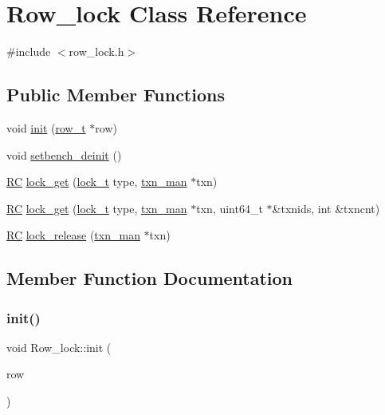 \hypertarget{classRow__lock}{}\section{Row\+\_\+lock Class Reference}
\label{classRow__lock}


{\ttfamily \#include $<$row\+\_\+lock.\+h$>$}

\subsection*{Public Member Functions}
\begin{DoxyCompactItemize}
\item 
void \hyperlink{classRow__lock_a6958edf717b09d6afb977c62a36ac76a}{init} (\hyperlink{classrow__t}{row\+\_\+t} $\ast$row)
\item 
void \hyperlink{classRow__lock_a1d79fae5c2c99d47eed437628ef21ab5}{setbench\+\_\+deinit} ()
\item 
\hyperlink{global_8h_a78c49a674c810fdd03d20432f7be864a}{RC} \hyperlink{classRow__lock_a73d7d8b8dba43b90e69e52f8596dd4c7}{lock\+\_\+get} (\hyperlink{global_8h_a1da8554b34c21f74268d962b6559b0a6}{lock\+\_\+t} type, \hyperlink{classtxn__man}{txn\+\_\+man} $\ast$txn)
\item 
\hyperlink{global_8h_a78c49a674c810fdd03d20432f7be864a}{RC} \hyperlink{classRow__lock_a09a8f64b3aa2560f46f185f603fb3571}{lock\+\_\+get} (\hyperlink{global_8h_a1da8554b34c21f74268d962b6559b0a6}{lock\+\_\+t} type, \hyperlink{classtxn__man}{txn\+\_\+man} $\ast$txn, uint64\+\_\+t $\ast$\&txnids, int \&txncnt)
\item 
\hyperlink{global_8h_a78c49a674c810fdd03d20432f7be864a}{RC} \hyperlink{classRow__lock_adb95df1dc909b5f6400506ae00255834}{lock\+\_\+release} (\hyperlink{classtxn__man}{txn\+\_\+man} $\ast$txn)
\end{DoxyCompactItemize}


\subsection{Member Function Documentation}
\mbox{\label{classRow__lock_a6958edf717b09d6afb977c62a36ac76a}} 
\subsubsection{\texorpdfstring{init()}{init()}}
{\footnotesize\ttfamily void Row\+\_\+lock\+::init (\begin{DoxyParamCaption}\item[{\hyperlink{classrow__t}{row\+\_\+t} $\ast$}]{row }\end{DoxyParamCaption})}

